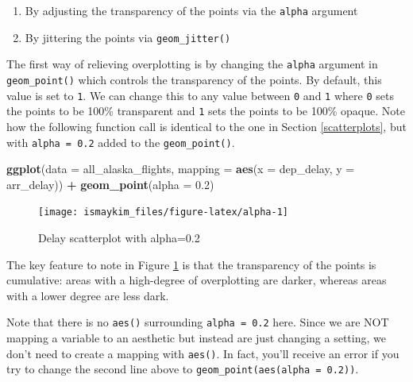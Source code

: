 \documentclass[12pt,]{krantz}
\makeatletter
\newenvironment{Shaded}{\begin{snugshade}}{\end{snugshade}}
\newcommand{\KeywordTok}[1]{\textcolor[rgb]{0.27,0.27,0.27}{\textbf{#1}}}
\newcommand{\DataTypeTok}[1]{\textcolor[rgb]{0.27,0.27,0.27}{#1}}
\newcommand{\FloatTok}[1]{\textcolor[rgb]{0.06,0.06,0.06}{#1}}
\newcommand{\StringTok}[1]{\textcolor[rgb]{0.5,0.5,0.5}{#1}}
\newcommand{\OperatorTok}[1]{\textcolor[rgb]{0.43,0.43,0.43}{\textbf{#1}}}
\newcommand{\NormalTok}[1]{#1}
\providecommand{\tightlist}{%
  \setlength{\itemsep}{0pt}\setlength{\parskip}{0pt}}
\newenvironment{kframe}{%
\medskip{}
\setlength{\fboxsep}{.8em}
 \def\at@end@of@kframe{}%
 \ifinner\ifhmode%
  \def\at@end@of@kframe{\end{minipage}}%
  \begin{minipage}{\columnwidth}%
 \fi\fi%
 \def\FrameCommand##1{\hskip\@totalleftmargin \hskip-\fboxsep
 \colorbox{shadecolor}{##1}\hskip-\fboxsep
     \hskip-\linewidth \hskip-\@totalleftmargin \hskip\columnwidth}%
 \MakeFramed {\advance\hsize-\width
   \@totalleftmargin\z@ \linewidth\hsize
   \@setminipage}}%
 {\par\unskip\endMakeFramed%
 \at@end@of@kframe}
\renewenvironment{Shaded}{\begin{kframe}}{\end{kframe}}
\makeatother
\begin{document}
\begin{enumerate}
\def\labelenumi{\arabic{enumi}.}
\tightlist
\item
  By adjusting the transparency of the points via the \texttt{alpha}
  argument
\item
  By jittering the points via \texttt{geom\_jitter()}
\end{enumerate}

The first way of relieving overplotting is by changing the
\texttt{alpha} argument in \texttt{geom\_point()} which controls the
transparency of the points. By default, this value is set to \texttt{1}.
We can change this to any value between \texttt{0} and \texttt{1} where
\texttt{0} sets the points to be 100\% transparent and \texttt{1} sets
the points to be 100\% opaque. Note how the following function call is
identical to the one in Section \ref{scatterplots}, but with
\texttt{alpha\ =\ 0.2} added to the \texttt{geom\_point()}.

\begin{Shaded}
\begin{Highlighting}[]
\KeywordTok{ggplot}\NormalTok{(}\DataTypeTok{data =}\NormalTok{ all_alaska_flights, }
       \DataTypeTok{mapping =} \KeywordTok{aes}\NormalTok{(}\DataTypeTok{x =}\NormalTok{ dep_delay, }\DataTypeTok{y =}\NormalTok{ arr_delay)) }\OperatorTok{+}\StringTok{ }
\StringTok{  }\KeywordTok{geom_point}\NormalTok{(}\DataTypeTok{alpha =} \FloatTok{0.2}\NormalTok{)}
\end{Highlighting}
\end{Shaded}

\begin{figure}

{\centering \texttt{[image: ismaykim\_files/figure-latex/alpha-1]} 

}

\caption{Delay scatterplot with alpha=0.2}\label{fig:alpha}
\end{figure}

The key feature to note in Figure \ref{fig:alpha} is that the
transparency of the points is cumulative: areas with a high-degree of
overplotting are darker, whereas areas with a lower degree are less
dark.

Note that there is no \texttt{aes()} surrounding \texttt{alpha\ =\ 0.2}
here. Since we are NOT mapping a variable to an aesthetic but instead
are just changing a setting, we don't need to create a mapping with
\texttt{aes()}. In fact, you'll receive an error if you try to change
the second line above to \texttt{geom\_point(aes(alpha\ =\ 0.2))}.
\end{document}
